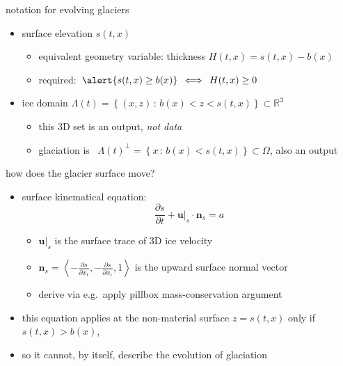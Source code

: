 \documentclass[aspectratio=169,10pt]{beamer}
\newcommand{\bn}{\mathbf{n}}
\newcommand{\bu}{\mathbf{u}}
\newcommand{\RR}{{\mathbb{R}}}
\newcommand{\lc}{{\text{\large $\circ$}}}
\begin{document}
\begin{frame}{notation for evolving glaciers}
\begin{overprint}
\begin{itemize}
\item \alert{surface elevation} $s(t,x)$ \grey{[m]} \hfill {}
    \begin{itemize}
    \item[$\lc$] equivalent geometry variable: \alert{thickness} $H(t,x)=s(t,x)-b(x)$
    \item[$\lc$] required:\, $\alert{s(t,x)\ge b(x)} \, \iff \, H(t,x)\ge 0$
    \end{itemize}
\item \alert{ice domain} $\displaystyle \Lambda(t) = \left\{(x,z) \,:\, b(x) < z < s(t,x)\right\} \subset \RR^3$  \hfill {}
    \begin{itemize}
    \item[$\lc$] this 3D set is an output, \emph{not data}
    \item[$\lc$] \alert{glaciation} is \, $\Lambda(t)^\perp = \left\{x \,:\, b(x) < s(t,x)\right\} \subset \Omega$, also an output
    \end{itemize}
\end{itemize}
\end{overprint}
\end{frame}


\begin{frame}{how does the glacier surface move?}

\begin{itemize}
\item \alert{surface kinematical equation}:
\begin{equation*}
\frac{\partial s}{\partial t} + \bu|_s \cdot \bn_s = a
\end{equation*}

    \begin{itemize}
    \item[$\lc$] $\bu|_s$ is the surface trace of 3D ice velocity \hfill {}
    \item[$\lc$] $\bn_s = \left<-\tfrac{\partial s}{\partial x_1}, -\tfrac{\partial s}{\partial x_1}, 1\right>$ is the upward surface normal vector \hfill {}
    \item[$\lc$] derive via e.g.~apply pillbox mass-conservation argument
    \end{itemize}

\pause
\medskip
\item this equation applies at the \alert{non-material} surface $z=s(t,x)$ \alert{only if  $s(t,x) > b(x)$},
\item so it \alert{cannot}, by itself, describe the evolution of glaciation
\end{itemize}
\end{frame}
\end{document}
